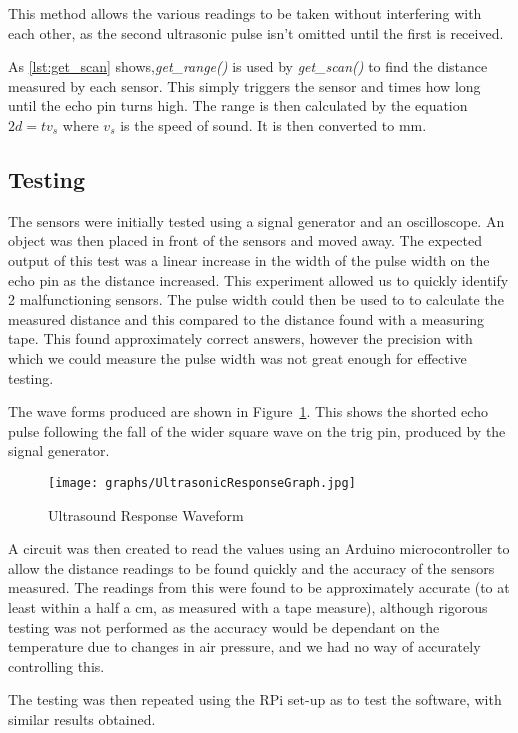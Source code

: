 This method allows the various readings to be taken without interfering with each other, as the second ultrasonic pulse isn't omitted until the first is received.

As \ref{lst:get_scan} shows,\textit{get\_range()} is used by
\textit{get\_scan()} to find the distance measured by each sensor.
This simply triggers the sensor and times how long until the echo
pin turns high. The range is then calculated by the equation
$ 2d = tv_s$ where $v_s$ is the speed of sound. It is then converted
to mm.

\subsection{Testing}\label{elec/range/test}
The sensors were initially tested using a signal generator and an
oscilloscope. An object was then placed in front of the sensors
and moved away. The expected output of this test was a linear increase
in the width of the pulse width on the echo pin as the distance
increased. This experiment allowed us to quickly identify 2
malfunctioning sensors. The pulse width could then be used to to
calculate the measured distance and this compared to the distance
found with a measuring tape. This found approximately correct answers,
however the precision with which we could measure the pulse width was
not great enough for effective testing.

The wave forms produced are shown in Figure~\ref{UltrasoundWaveform}.
This shows the shorted echo pulse following the fall of the wider
square wave on the trig pin, produced by the signal generator.

\begin{figure}[!ht]
	\centering
	\texttt{[image: graphs/UltrasonicResponseGraph.jpg]}
	\caption{Ultrasound Response Waveform}\label{UltrasoundWaveform}

\end{figure}

A circuit was then created to read the values using an Arduino
microcontroller to allow the distance readings to be found quickly
and the accuracy of the sensors measured. The readings from this were
found to be approximately accurate (to at least within a half a cm,
as measured with a tape measure), although rigorous testing was not
performed as the accuracy would be dependant on the temperature due
to changes in air pressure, and we had no way of accurately controlling
this.

The testing was then repeated using the RPi set-up as to test the
software, with similar results obtained.

